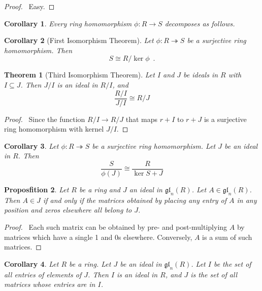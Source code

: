 \documentclass{book}
\let\qed\relax
\newtheorem{prop}{Proposfition}[chapter]
\newtheorem{thm}[prop]{Theorem}
\newtheorem{cor}{Corollary}[prop]
\theoremstyle{definition}
\newcommand{\gl}[2]{\ensuremath{\mathfrak{gl}_{#1} \left( {#2} \right)}}
\newcommand{\im}{\ensuremath{\operatorname{im}}}
\begin{document}
\begin{proof}
\pf\ Easy. \qed
\end{proof}

\begin{cor}
Every ring homomorphism $\phi : R \rightarrow S$ decomposes as follows.

\begin{center}
\end{center}
\end{cor}

\begin{cor}[First Isomorphism Theorem]
Let $\phi : R \twoheadrightarrow S$ be a surjective ring homomorphism. Then
\[ S \cong R / \ker \phi \enspace . \]
\end{cor}

\begin{thm}[Third Isomorphism Theorem]
Let $I$ and $J$ be ideals in $R$ with $I \subseteq J$. Then $J/I$ is an ideal in $R/I$, and
\[ \frac{R/I}{J/I} \cong R/J \]
\end{thm}

\begin{proof}
\pf\ Since the function $R/I \rightarrow R/J$ that maps $r + I$ to $r + J$ is a surjective ring homomorphism with kernel $J/I$. \qed
\end{proof}

\begin{cor}
Let $\phi : R \twoheadrightarrow S$ be a surjective ring homomorphism. Let $J$ be an ideal in $R$. Then
\[ \frac{S}{\phi(J)} \cong \frac{R}{\ker S + J} \]
\end{cor}

\begin{prop}
Let $R$ be a ring and $J$ an ideal in $\gl{n}{R}$. Let $A \in \gl{n}{R}$. Then $A \in J$ if and only if the matrices obtained by placing any entry of $A$ in any position and zeros elsewhere all belong to $J$.
\end{prop}

\begin{proof}
\pf\ Each such matrix can be obtained by pre- and post-multiplying $A$ by matrices which have a single 1 and 0s elsewhere. Conversely, $A$ is a sum of such matrices. \qed
\end{proof}

\begin{cor}
\label{cor:ideals-in-glnR}
Let $R$ be a ring. Let $J$ be an ideal in $\gl{n}{R}$. Let $I$ be the set of all entries of elements of $J$. Then $I$ is an ideal in $R$, and $J$ is the set of all matrices whose entries are in $I$.
\end{cor}
\end{document}

